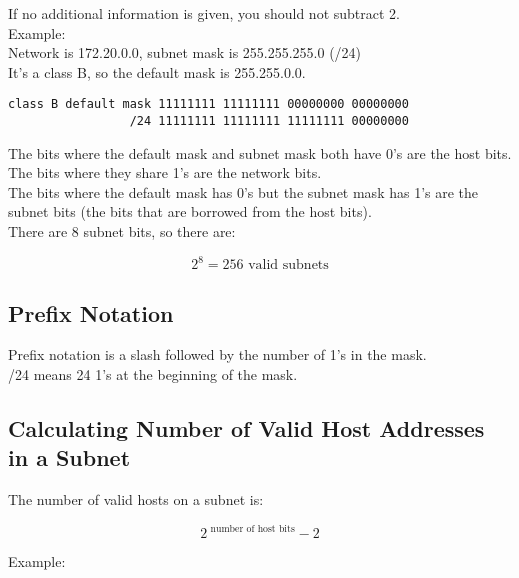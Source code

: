 If no additional information is given, you should not subtract 2.\\

Example:\\

Network is 172.20.0.0, subnet mask is 255.255.255.0 (/24)\\

It's a class B, so the default mask is 255.255.0.0.

\begin{verbatim}
class B default mask 11111111 11111111 00000000 00000000
                 /24 11111111 11111111 11111111 00000000
\end{verbatim}

The bits where the default mask and subnet mask both have 0's are the host
bits.\\

The bits where they share 1's are the network bits.\\

The bits where the default mask has 0's but the subnet mask has 1's are the
subnet bits (the bits that are borrowed from the host bits).\\

There are 8 subnet bits, so there are:

\begin{equation}
2 ^ 8 = 256 \mbox{ valid subnets}
\end{equation}

\subsection{Prefix Notation}

Prefix notation is a slash followed by the number of 1's in the mask.\\

/24 means 24 1's at the beginning of the mask.

\subsection{Calculating Number of Valid Host Addresses in a Subnet}

The number of valid hosts on a subnet is:

\begin{equation}
2 ^ {\mbox{ number of host bits}} - 2
\end{equation}

Example:\\


